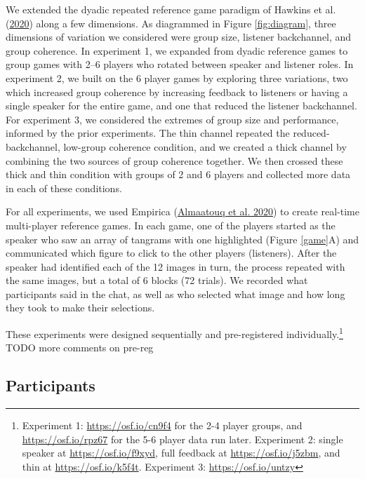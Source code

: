 \documentclass[
  english,
  a4paper,
]{article}
\begin{document}
We extended the dyadic repeated reference game paradigm of Hawkins et al. (\protect\hyperlink{ref-hawkinsCharacterizingDynamicsLearning2020}{2020}) along a few dimensions. As diagrammed in Figure \ref{fig:diagram}, three dimensions of variation we considered were group size, listener backchannel, and group coherence. In experiment 1, we expanded from dyadic reference games to group games with 2--6 players who rotated between speaker and listener roles. In experiment 2, we built on the 6 player games by exploring three variations, two which increased group coherence by increasing feedback to listeners or having a single speaker for the entire game, and one that reduced the listener backchannel. For experiment 3, we considered the extremes of group size and performance, informed by the prior experiments. The thin channel repeated the reduced-backchannel, low-group coherence condition, and we created a thick channel by combining the two sources of group coherence together. We then crossed these thick and thin condition with groups of 2 and 6 players and collected more data in each of these conditions.

For all experiments, we used Empirica (\protect\hyperlink{ref-almaatouqEmpiricaVirtualLab2020}{Almaatouq et al. 2020}) to create real-time multi-player reference games. In each game, one of the players started as the speaker who saw an array of tangrams with one highlighted (Figure \ref{game}A) and communicated which figure to click to the other players (listeners). After the speaker had identified each of the 12 images in turn, the process repeated with the same images, but a total of 6 blocks (72 trials). We recorded what participants said in the chat, as well as who selected what image and how long they took to make their selections.

These experiments were designed sequentially and pre-registered individually.\footnote{Experiment 1: \url{https://osf.io/cn9f4} for the 2-4 player groups, and \url{https://osf.io/rpz67} for the 5-6 player data run later. Experiment 2: single speaker at \url{https://osf.io/f9xyd}, full feedback at \url{https://osf.io/j5zbm}, and thin at \url{https://osf.io/k5f4t}. Experiment 3: \url{https://osf.io/untzy}} TODO more comments on pre-reg

\hypertarget{participants}{%
\subsection{Participants}\label{participants}}
\end{document}
